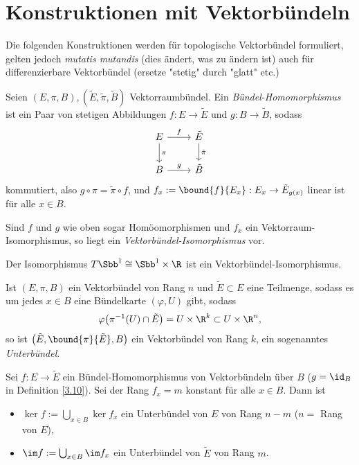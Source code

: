\section{Konstruktionen mit Vektorbündeln}

\begin{rem}\lecture
	Die folgenden Konstruktionen werden für topologische Vektorbündel formuliert, gelten jedoch \emph{mutatis mutandis} (dies ändert, was zu ändern ist) auch für differenzierbare Vektorbündel (ersetze "stetig" durch "glatt" etc.)
\end{rem}

\begin{defn}\label{3.10}
	Seien $ (E,\pi,B),(\tilde{E},\tilde{\pi},\tilde{B}) $ Vektorraumbündel. Ein \emph{Bündel-Homomorphismus} ist ein Paar von stetigen Abbildungen $f: E \to \tilde{E}$ und $g: B \to \tilde{B}$, sodass
	\[ \begin{tikzcd}
		E \arrow{r}{f} \arrow{d}{\pi} & \tilde{E} \arrow{d}{\tilde{\pi}}\\
		B \arrow{r}{g} & \tilde{B}
	\end{tikzcd} \]
	kommutiert, also $g \circ \pi = \tilde{\pi} \circ f$, und $ f_x := \bound{f}{E_x}: E_x \to \tilde{E}_{g(x)} $ linear ist für alle $x \in B$.
\end{defn}

Sind $f$ und $g$ wie oben sogar Homöomorphismen und $f_x$ ein Vektorraum-Isomorphismus, so liegt ein \emph{Vektorbündel-Isomorphismus} vor.

\begin{exmp*}
	Der Isomorphismus $ T\Sbb^1 \cong \Sbb^1\times \R $ ist ein Vektorbündel-Isomorphismus.
\end{exmp*}

\begin{defn}[Unterbündel]
	Ist $ (E,\pi,B) $ ein Vektorbündel von Rang $n$ und $\tilde{E} \subset E$ eine Teilmenge, sodass es um jedes $x \in B$ eine Bündelkarte $(\varphi,U)$ gibt, sodass
	\[ \varphi \big(\pi^{-1}(U) \cap \tilde{E} \big) = U \times \R^k \subset U \times \R^n, \]
	so ist $ \big( \tilde{E}, \bound{\pi}{\tilde{E}},B \big) $ ein Vektorbündel von Rang $k$, ein sogenanntes \emph{Unterbündel}.
\end{defn}

\begin{lem}
	Sei $f: E \to \tilde{E}$ ein Bündel-Homomorphismus von Vektorbündeln über $B$ ($g = \id_B$ in Definition \ref{3.10}). Sei der Rang $f_x = m$ konstant für alle $x \in B$. Dann ist
	\begin{itemize}
		\item $ \ker f := \bigcup_{x \in B} \ker f_x $ ein Unterbündel von $E$ von Rang $n-m$ ($n = $ Rang von $E$),
		\item $ \im f := \bigcup_{x \in B} \im f_x $ ein Unterbündel von $\tilde{E}$ von Rang $m$.
	\end{itemize}
\end{lem}

